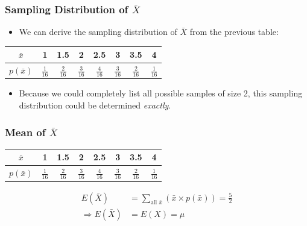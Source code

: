 \documentclass[12pt]{beamer}
\begin{document}
\begin{frame}
	\frametitle{Sampling Distribution of $\bar{X}$}
	
	\begin{itemize}[label={\color{blue}$\blacktriangleright$}]
		\item We can derive the sampling distribution of $\bar{X}$ from the previous table:
	\end{itemize}
	
	\vspace{0.5cm}
	
	\begin{table}
		\centering
		\begin{tabular}{cccccccc}
			\toprule
			$\bar{x}$ & 1 & 1.5 & 2 & 2.5 & 3 & 3.5 & 4 \\
			\midrule
			$p(\bar{x})$ & $\frac{1}{16}$ & $\frac{2}{16}$ & $\frac{3}{16}$ & $\frac{4}{16}$ & $\frac{3}{16}$ & $\frac{2}{16}$ & $\frac{1}{16}$ \\
			\bottomrule
		\end{tabular}
	\end{table}
	
	\vspace{0.5cm}
	
	\begin{itemize}[label={\color{blue}$\blacktriangleright$}]
		\item Because we could completely list all possible samples of size 2, this sampling distribution could be determined \textit{exactly}.
	\end{itemize}
	
\end{frame}
\begin{frame}
	\frametitle{Mean of $\bar{X}$}
	
	\vspace{0.5cm}
	
	\begin{table}
		\centering
		\begin{tabular}{cccccccc}
			\toprule
			$\bar{x}$ & 1 & 1.5 & 2 & 2.5 & 3 & 3.5 & 4 \\
			\midrule
			$p(\bar{x})$ & $\frac{1}{16}$ & $\frac{2}{16}$ & $\frac{3}{16}$ & $\frac{4}{16}$ & $\frac{3}{16}$ & $\frac{2}{16}$ & $\frac{1}{16}$ \\
			\bottomrule
		\end{tabular}
	\end{table}
	
	\vspace{1cm}
	
	\begin{align*}
		E(\bar{X}) &= \sum_{\text{all } \bar{x}} (\bar{x} \times p(\bar{x})) = \frac{5}{2} \\[1em]
		\Rightarrow E(\bar{X}) &= E(X) = \mu
	\end{align*}
	
\end{frame}
\end{document}
